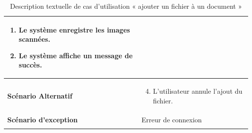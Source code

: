 \begin{longtable}{|p{5cm}|p{10cm}|}
\begin{enumerate}
    \item Le système enregistre les images scannées.
    \item Le système affiche un message de succès.
\end{enumerate}\\
\hline
\textbf{Scénario Alternatif}&
\vspace{-\baselineskip}
\begin{enumerate}
    \setcounter{enumi}{3}
    \item L'utilisateur annule l'ajout du fichier.
\end{enumerate}\\
\hline
\textbf{Scénario d'exception}&Erreur de connexion\\
\hline
\caption{Description textuelle de cas d'utilisation « ajouter un fichier à un document »}
\label{tab:DescriptionTextuelleDeCasDUtilisationAjouterUnFichierAUnDocument}

\end{longtable}



    
    
    



